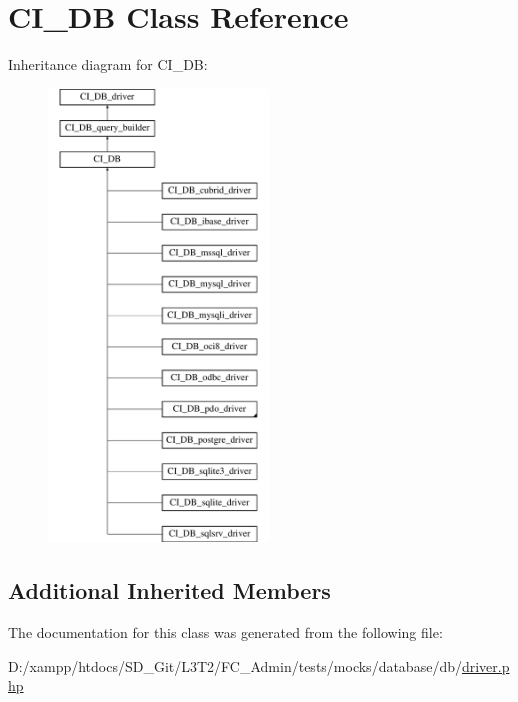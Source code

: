 \hypertarget{class_c_i___d_b}{}\section{C\+I\+\_\+\+D\+B Class Reference}
\label{class_c_i___d_b}
Inheritance diagram for C\+I\+\_\+\+D\+B\+:\begin{figure}[H]
\begin{center}
\leavevmode
\includegraphics[height=12.000000cm]{class_c_i___d_b}
\end{center}
\end{figure}
\subsection*{Additional Inherited Members}


The documentation for this class was generated from the following file\+:\begin{DoxyCompactItemize}
\item 
D\+:/xampp/htdocs/\+S\+D\+\_\+\+Git/\+L3\+T2/\+F\+C\+\_\+\+Admin/tests/mocks/database/db/\hyperlink{tests_2mocks_2database_2db_2_driver_8php}{driver.\+php}\end{DoxyCompactItemize}
